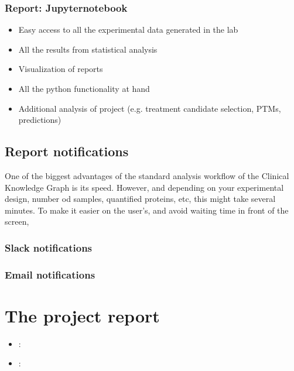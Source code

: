 \documentclass[letterpaper,10pt,english]{sphinxmanual}
\begin{document}
\subsection{Report: Jupyter\sphinxhyphen{}notebook}
\label{\detokenize{getting_started/report_access/jupyter-notebook:report-jupyter-notebook}}\label{\detokenize{getting_started/report_access/jupyter-notebook::doc}}\begin{itemize}
\item {} 
Easy access to all the experimental data generated in the lab

\item {} 
All the results from statistical analysis

\item {} 
Visualization of reports

\item {} 
All the python functionality at hand

\item {} 
Additional analysis of project (e.g. treatment candidate selection, PTMs, predictions)

\end{itemize}


\section{Report notifications}
\label{\detokenize{getting_started/notifications:report-notifications}}\label{\detokenize{getting_started/notifications::doc}}
One of the biggest advantages of the standard analysis workflow of the Clinical Knowledge Graph is its speed. However, and depending on your experimental design, number od samples, quantified proteins, etc, this might take several minutes.
To make it easier on the user’s, and avoid waiting time in front of the screen,


\subsection{Slack notifications}
\label{\detokenize{getting_started/notifications:slack-notifications}}

\subsection{E\sphinxhyphen{}mail notifications}
\label{\detokenize{getting_started/notifications:e-mail-notifications}}

\chapter{The project report}
\label{\detokenize{index:the-project-report}}\begin{itemize}
\item {} 
:
{\hyperref[\detokenize{project_report/project-report::doc}]{}}

\item {} 
:
{\hyperref[\detokenize{project_report/project-tabs::doc}]{}}

\end{itemize}
\end{document}
